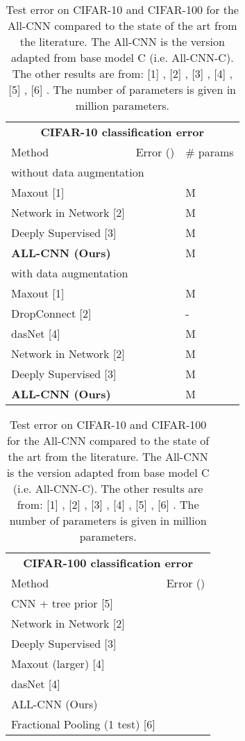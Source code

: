 \documentclass{article} \usepackage{iclr2015,times}
\begin{document}
\begin{table}[h]
\caption{Test error on CIFAR-10 and CIFAR-100 for the All-CNN compared to the
  state of the art from the literature. The All-CNN is the version
  adapted from base model C (i.e. All-CNN-C). The other results are from: [1]
  \citep{Goodfellow2013}, [2] \citep{Lin_2014}, [3] \citep{Lee_2014},
  [4] \citep{Stollenga_2014}, [5] \citep{Nitish2013}, [6] \citep{Graham2015}. The number of
  parameters is given in million parameters.}
\label{results-cifar10}
\begin{minipage}{0.49\linewidth}
\centering
\begin{tabular}{lll}
\multicolumn{3}{c}{\bf CIFAR-10 classification error} \\
\multicolumn{1}{l}{Method} & \multicolumn{1}{l}{Error ()} & \multicolumn{1}{l}{\# params} \\
\hline
\multicolumn{3}{l}{without data augmentation} \\
\hline
Maxout [1]          &   &  M \\
Network in Network [2]         &   &  M \\
Deeply Supervised [3]        &   &  M \\
\textbf{ALL-CNN (Ours)}         &   &  M \\
\hline
\multicolumn{3}{l}{with data augmentation} \\
\hline
Maxout [1]         &   &  M \\
DropConnect [2]         &   & - \\
dasNet [4]         &   &  M \\
Network in Network [2]         &   &  M \\
Deeply Supervised [3]         &   &  M \\
\textbf{ALL-CNN (Ours)}         &   &  M \\
\end{tabular}
\end{minipage}
\hspace{0.5cm}
\begin{minipage}{0.49\linewidth}
\centering
\begin{tabular}{ll}
\multicolumn{2}{c}{\bf CIFAR-100 classification error } \\
Method & Error () \\ \hline
CNN + tree prior [5]         &   \\ Network in Network [2]         &   \\Deeply Supervised [3]         &   \\ Maxout (larger) [4]         &   \\ dasNet [4]         &   \\ALL-CNN (Ours)         &   \\Fractional Pooling (1 test) [6]  &  \\

\end{tabular}
\end{minipage}
\end{table}
\end{document}

